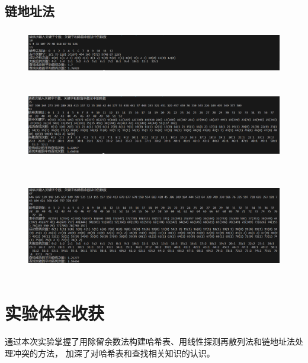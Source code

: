 \documentclass{ctexart}
\begin{document}
	\subsection{链地址法}
	\begin{figure}[H]
	\centering 
	\includegraphics[height=2cm,width=14cm]{7.png}
	\end{figure}
	\begin{figure}[H]
	\centering 
	\includegraphics[height=3.5cm,width=14cm]{8.png}
	\end{figure}
	\begin{figure}[H]
	\centering 
	\includegraphics[height=4.5cm,width=14cm]{9.png}
	\end{figure}
\section{实验体会收获}
   通过本次实验掌握了用除留余数法构建哈希表、用线性探测再散列法和链地址法处理冲突的方法，
   加深了对哈希表和查找相关知识的认识。
\end{document}
